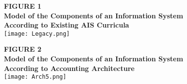 \documentclass[12pt]{article}
\begin{document}
\newpage{}

\begin{figure}[!h]
\begin{center}
\textbf{\MakeUppercase{Figure 1}}\\[.2in]
\textbf{Model of the Components of an Information System According to Existing AIS Curricula}\\[.4in]
\texttt{[image: Legacy.png]}
\end{center}
\end{figure}
\newpage{}

\begin{figure}[!h]
\begin{center}
\textbf{\MakeUppercase{Figure 2}}\\[.2in]
\textbf{Model of the Components of an Information System According to Accounting Architecture}\\[.4in]
\texttt{[image: Arch5.png]}
\end{center}
\end{figure}
\end{document}
